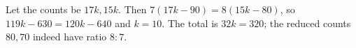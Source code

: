 Let the counts be $ 17k,15k $. Then $ 7(17k-90)=8(15k-80)$, so $ 119k-630=120k-640 $ and $ k=10 $. The total is $ 32k=\boxed{320}$; the reduced counts $ 80,70 $ indeed have ratio $ 8:7 $.
